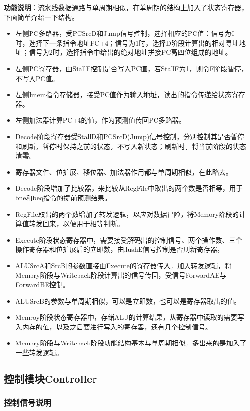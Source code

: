 \documentclass[12pt]{article} %
\begin{document}
\begin{sloppypar}
{\bf 功能说明}：流水线数据通路与单周期相似，在单周期的结构上加入了状态寄存器，下面简单介绍一下结构。
\begin{itemize}
\item 左侧PC多路器，受PCSrcD和Jump信号控制，选择相应的PC值：信号为0时，选择下一条指令地址PC+4；信号为1时，选择D阶段计算出的相对寻址地址；信号为2时，选择指令中给出的绝对地址拼接PC高四位组成的地址。
\item 左侧PC寄存器，由StallF控制是否写入PC值，若StallF为1，则令F阶段暂停，不写入PC值。
\item 左侧Imem指令存储器，接受PC值作为输入地址，读出的指令传递给状态寄存器。
\item 左侧加法器计算PC+4的值，作为预测值传回PC多路器。
\item Decode阶段寄存器受StallD和PCSrcD(Jump)信号控制，分别控制其是否暂停和刷新，暂停时保持之前的状态，不写入新状态；刷新时，将当前阶段的状态清零。
\item 寄存器文件、位扩展、移位器、加法器作用都与单周期相似，在此略去。
\item Decode阶段增加了比较器，来比较从RegFile中取出的两个数是否相等，用于bne和beq指令的提前预测结果。
\item RegFile取出的两个数增加了转发逻辑，以应对数据冒险，将Memory阶段的计算值转发回来，以便用于相等判断。
\item Execute阶段状态寄存器中，需要接受解码出的控制信号、两个操作数、三个操作寄存器和位扩展后的立即数，由flushE信号控制是否刷新寄存器。
\item ALUSrcA和SrcB的参数直接由Execute的寄存器传入，加入转发逻辑，将Memory阶段与Writeback阶段计算出的信号传回，受信号ForwardAE与ForwardBE控制。
\item ALUSrcB的参数与单周期相似，可以是立即数，也可以是寄存器取出的值。
\item Memroy阶段状态寄存器中，存储ALU的计算结果，从寄存器中读取的需要写入内存的值，以及之后要进行写入的寄存器，还有几个控制信号。
\item Memory阶段与Writeback阶段功能结构基本与单周期相似，多出来的是加入了一些转发逻辑。
\end{itemize}

\subsection{控制模块Controller}

\subsubsection{控制信号说明}


\end{sloppypar}
\end{document}
